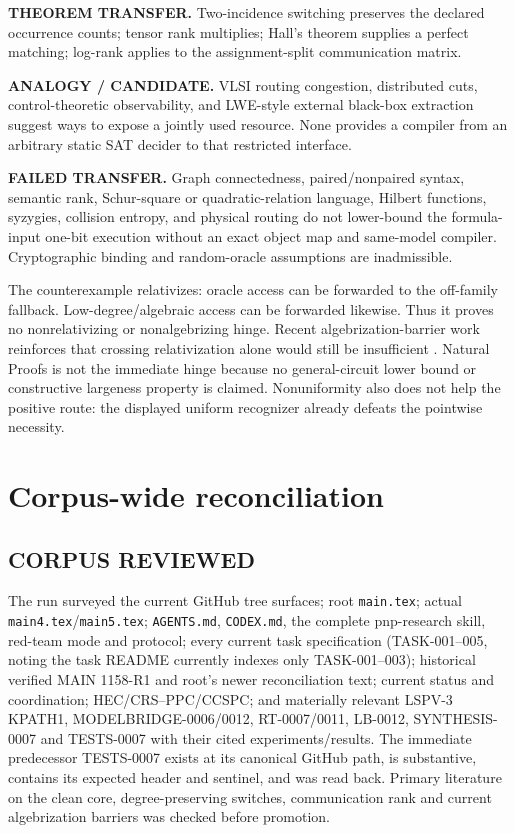 \documentclass[11pt]{article}
\begin{document}
\begin{description}[leftmargin=0cm,labelwidth=0cm]
\item[] \textbf{THEOREM TRANSFER.}
Two-incidence switching preserves the declared occurrence counts; tensor
rank multiplies; Hall's theorem supplies a perfect matching; log-rank applies
to the assignment-split communication matrix.
\item[] \textbf{ANALOGY / CANDIDATE.}
VLSI routing congestion, distributed cuts, control-theoretic observability,
and LWE-style external black-box extraction suggest ways to expose a jointly
used resource.  None provides a compiler from an arbitrary static SAT
decider to that restricted interface.
\item[] \textbf{FAILED TRANSFER.}
Graph connectedness, paired/nonpaired syntax, semantic rank, Schur-square or
quadratic-relation language, Hilbert functions, syzygies, collision entropy,
and physical routing do not lower-bound the formula-input one-bit execution
without an exact object map and same-model compiler.  Cryptographic binding
and random-oracle assumptions are inadmissible.
\end{description}

The counterexample relativizes: oracle access can be forwarded to the
off-family fallback.  Low-degree/algebraic access can be forwarded likewise.
Thus it proves no nonrelativizing or nonalgebrizing hinge.  Recent
algebrization-barrier work reinforces that crossing relativization alone
would still be insufficient \cite{chen}.  Natural Proofs is not the immediate
hinge because no general-circuit lower bound or constructive largeness
property is claimed.  Nonuniformity also does not help the positive route:
the displayed uniform recognizer already defeats the pointwise necessity.

\section{Corpus-wide reconciliation}

\subsection*{CORPUS REVIEWED}
The run surveyed the current GitHub tree surfaces; root \texttt{main.tex};
actual \texttt{main4.tex}/\texttt{main5.tex}; \texttt{AGENTS.md},
\texttt{CODEX.md}, the complete pnp-research skill, red-team mode and
protocol; every current task specification (TASK-001--005, noting the task
README currently indexes only TASK-001--003); historical verified MAIN
1158-R1 and root's newer reconciliation text; current status and
coordination; HEC/CRS--PPC/CCSPC; and materially relevant LSPV-3 KPATH1,
MODELBRIDGE-0006/0012, RT-0007/0011, LB-0012, SYNTHESIS-0007 and
TESTS-0007 with their cited experiments/results.  The immediate predecessor
TESTS-0007 exists at its canonical GitHub path, is substantive, contains its
expected header and sentinel, and was read back.  Primary literature on the
clean core, degree-preserving switches, communication rank and current
algebrization barriers was checked before promotion.
\end{document}
